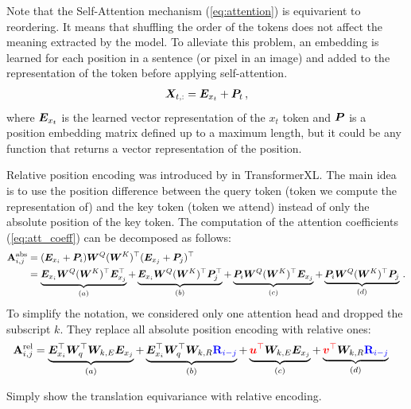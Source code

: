 \documentclass{article} %
\begin{document}
Note that the Self-Attention mechanism (\ref{eq:attention}) is equivarient to reordering.
%
It means that shuffling the order of the tokens does not affect the meaning extracted by the model.
%
To alleviate this problem, an embedding is learned for each position in a sentence (or pixel in an image) and added to the representation of the token before applying self-attention.
\begin{align}
  {\bm{X}}_{t,:} = {\bm{E}}_{x_t} + {\bm{P}}_t\,,
\end{align}
where ${\bm{E}}_{x_t}$ is the learned vector representation of the $x_t$ token and ${\bm{P}}$ is a position embedding matrix defined up to a maximum length, but it could be any function that returns a vector representation of the position.

Relative position encoding was introduced by \cite{dai2019transformerxl} in TransformerXL. 
%
The main idea is to use the position difference between the query token (token we compute the representation of) and the key token (token we attend) instead of only the absolute position of the key token.
%
The computation of the attention coefficients (\cref{eq:att_coeff}) can be decomposed as follows:
%
\begin{align}
    \mathbf{A}_{i, j}^{\mathrm{abs}} 
    &= ({\bm{E}}_{x_i} + {\bm{P}}_i) {\bm{W}}^Q ({\bm{W}}^K)^\top ({\bm{E}}_{x_j} + {\bm{P}}_j)^\top\\
 &=
  \underbrace{{\bm{E}}_{x_{i}} {\bm{W}}^{Q} ({\bm{W}}^K)^\top {\bm{E}}_{x_{j}}^\top}_{(a)} 
  +
  \underbrace{{\bm{E}}_{x_{i}} {\bm{W}}^{Q} ({\bm{W}}^{K})^\top {\bm{P}}_{j}^\top}_{(b)}
  +
  \underbrace{{\bm{P}}_{i}{\bm{W}}^{Q} ({\bm{W}}^{K})^\top {\bm{E}}_{x_{j}}}_{(c)}
  +
  \underbrace{{\bm{P}}_{i} {\bm{W}}^{Q} ({\bm{W}}^{K})^\top {\bm{P}}_{j}}_{(d)}\,.
\end{align}
To simplify the notation, we considered only one attention head and dropped the subscript $k$. They replace all absolute position encoding with relative ones:
\begin{align}
  \mathbf{A}_{i, j}^{\mathrm{rel}} &=
  \underbrace{{\bm{E}}_{x_{i}}^{\top} {\bm{W}}_{q}^{\top} {\bm{W}}_{k, E} {\bm{E}}_{x_{j}}}_{(a)}
  +
  \underbrace{{\bm{E}}_{x_{i}}^{\top} {\bm{W}}_{q}^{\top} {\bm{W}}_{k, R} {\color{blue} \mathbf{R}_{i-j}}}_{(b)}
  +
  \underbrace{{\color{red} {\bm{u}}^{\top}} {\bm{W}}_{k, E} {\bm{E}}_{x_{j}}}_{(c)}
  +
  \underbrace{{\color{red} {\bm{v}}^{\top}} {\bm{W}}_{k, R} {\color{blue} \mathbf{R}_{i-j}}}_{(d)}
  \label{eq:att_rel}
\end{align}


Simply show the translation equivariance with relative encoding.
\end{document}
